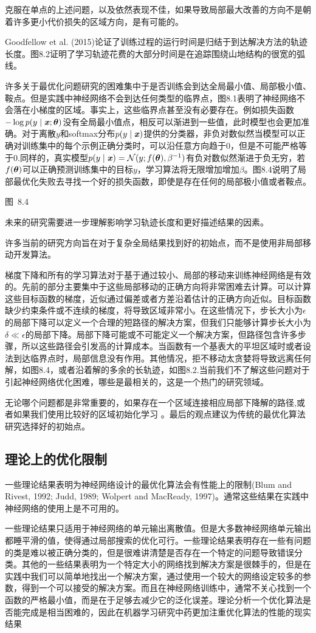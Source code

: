 克服在单点的上述问题，以及依然表现不佳，如果导致局部最大改善的方向不是朝着许多更小代价损失的区域方向，是有可能的。

Goodfellow et al. (2015)论证了训练过程的运行时间是归结于到达解决方法的轨迹长度。图8.2证明了学习轨迹花费的大部分时间是在追踪围绕山地结构的很宽的弧线。

许多关于最优化问题研究的困难集中于是否训练会到达全局最小值、局部极小值、鞍点。但是实践中神经网络不会到达任何类型的临界点，图8.1表明了神经网络不会落在小梯度的区域。事实上，这些临界点甚至没有必要存在。例如损失函数$-\log p(y\mid\boldsymbol{\mathit{x}};\boldsymbol{\theta})$没有全局最小值点，相反可以渐进到一些值，此时模型也会更加准确。对于离散$y$和softmax分布$p(y\mid\boldsymbol{\mathit{x}})$提供的分类器，非负对数似然当模型可以正确对训练集中的每个示例正确分类时，可以沿任意方向趋于0，但是不可能严格等于0.同样的，真实模型$p(y\mid\boldsymbol{\mathit{x}}) = \mathcal{N}(y;f(\boldsymbol{\theta}),\beta^{-1})$有负对数似然渐进于负无穷，若$f(\boldsymbol{\theta})$可以正确预测训练集中的目标$y$，学习算法将无限增加增加$\beta$。图8.4说明了局部最优化失败去寻找一个好的损失函数，即使是存在任何的局部极小值或者鞍点。

\begin{center}
图~8.4
\end{center}

未来的研究需要进一步理解影响学习轨迹长度和更好描述结果的因素。

许多当前的研究方向旨在对于复杂全局结果找到好的初始点，而不是使用非局部移动开发算法。

梯度下降和所有的学习算法对于基于通过较小、局部的移动来训练神经网络是有效的。先前的部分主要集中于这些局部移动的正确方向将非常困难去计算。可以计算这些目标函数的梯度，近似通过偏差或者方差沿着估计的正确方向近似。目标函数缺少约束条件或不连续的梯度，将导致区域非常小。在这些情况下，步长大小为$\epsilon$的局部下降可以定义一个合理的短路径的解决方案，但我们只能够计算步长大小为$\delta \ll \epsilon$的局部下降。局部下降可能或不可能定义一个解决方案，但路径包含许多步骤，所以这些路径会引发高的计算成本。当函数有一个基表大的平坦区域时或者设法到达临界点时，局部信息没有作用。其他情况，拒不移动太贪婪将导致远离任何解，如图8.4，或者沿着解的多余的长轨迹，如图8.2.当前我们不了解这些问题对于引起神经网络优化困难，哪些是最相关的，这是一个热门的研究领域。

无论哪个问题都是非常重要的，如果存在一个区域连接相应局部下降解的路径,或者如果我们使用比较好的区域初始化学习 。最后的观点建议为传统的最优化算法研究选择好的初始点。

\subsection{理论上的优化限制}
一些理论结果表明为神经网络设计的最优化算法会有性能上的限制(Blum and Rivest,
1992; Judd, 1989; Wolpert and MacReady, 1997)。通常这些结果在实践中神经网络的使用上是不可用的。

一些理论结果只适用于神经网络的单元输出离散值。但是大多数神经网络单元输出都睡平滑的值，使得通过局部搜索的优化可行。一些理论结果表明存在一些有问题的类是难以被正确分类的，但是很难讲清楚是否存在一个特定的问题导致错误分类。其他的一些结果表明为一个特定大小的网络找到解决方案是很棘手的，但是在实践中我们可以简单地找出一个解决方案，通过使用一个较大的网络设定较多的参数，得到一个可以接受的解决方案。而且在神经网络训练中，通常不关心找到一个函数的严格最小值，而是在于足够去减少它的泛化误差。理论分析一个优化算法是否能完成是相当困难的，因此在机器学习研究中药更加注重优化算法的性能的现实结果

